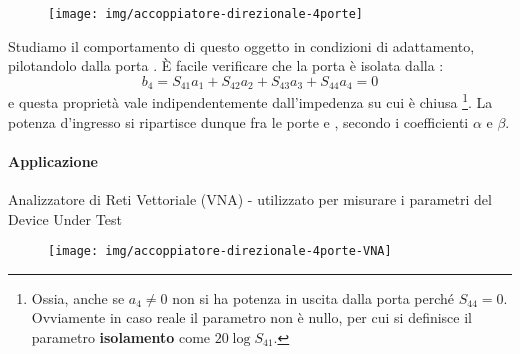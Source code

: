 %
%

\begin{figure}[tbh]
	\centering
	\texttt{[image: img/accoppiatore-direzionale-4porte]}
	\caption{}
	\label{fig:accoppiatore-direzionale-4porte}
\end{figure}


Studiamo il comportamento di questo oggetto in condizioni di adattamento, pilotandolo dalla porta . È facile verificare che la porta  è isolata dalla :
\[b_4 = S_{41}a_1 + S_{42}a_2 + S_{43}a_3+S_{44}a_4 = 0\]
e questa proprietà vale indipendentemente dall'impedenza su cui è chiusa \footnote{Ossia, anche se $a_4\neq0$ non si ha potenza in uscita dalla porta  perché $S_{44}=0$. Ovviamente in caso reale il parametro non è nullo, per cui si definisce il parametro \textbf{isolamento} come $20\log S_{41}$.}.
La potenza d'ingresso si ripartisce dunque fra le porte  e , secondo i coefficienti $\alpha$ e $\beta$.



\paragraph{Applicazione} Analizzatore di Reti Vettoriale (VNA) - utilizzato per misurare i parametri del Device Under Test
\begin{figure}[bh]
	\centering
	\texttt{[image: img/accoppiatore-direzionale-4porte-VNA]}
	\caption{}
	\label{fig:accoppiatore-direzionale-4porte-vna}
\end{figure}


